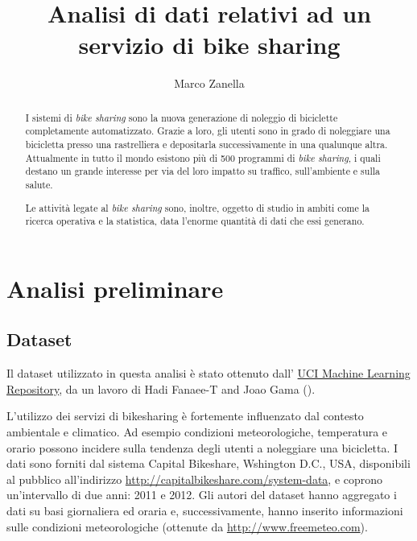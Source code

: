 \documentclass[a4paper, 10pt]{report}
\begin{document}
\title{Analisi di dati relativi ad un\\servizio di bike sharing}
\author{Marco Zanella}
\maketitle




\begin{abstract}
  I sistemi di \emph{bike sharing} sono la nuova generazione di noleggio di
  biciclette completamente automatizzato. Grazie a loro, gli utenti
  sono in grado di noleggiare una bicicletta presso una rastrelliera
  e depositarla successivamente in una qualunque altra. Attualmente in tutto il
  mondo esistono più di 500 programmi di \emph{bike sharing}, i quali
  destano un grande interesse per via del loro impatto su traffico,
  sull'ambiente e sulla salute.
  
  Le attività legate al \emph{bike sharing} sono, inoltre, oggetto di studio
  in ambiti come la ricerca operativa e la statistica, data l'enorme quantità
  di dati che essi generano.
\end{abstract}



\chapter{Analisi preliminare}
\section{Dataset}
Il dataset utilizzato in questa analisi è stato ottenuto dall'
\href{http://archive.ics.uci.edu/ml}{UCI Machine Learning Repository},
da un lavoro di Hadi Fanaee-T and Joao Gama (\cite{fanaee2013}).

L'utilizzo dei servizi di bikesharing è fortemente influenzato dal
contesto ambientale e climatico. Ad esempio condizioni meteorologiche,
temperatura e orario possono incidere sulla tendenza degli utenti a
noleggiare una bicicletta. I dati sono forniti dal sistema Capital
Bikeshare, Wshington D.C., USA, disponibili al pubblico all'indirizzo
\url{http://capitalbikeshare.com/system-data}, e coprono un'intervallo
di due anni: 2011 e 2012. Gli autori del dataset hanno aggregato i dati
su basi giornaliera ed oraria e, successivamente, hanno inserito informazioni
sulle condizioni meteorologiche (ottenute da \url{http://www.freemeteo.com}).
\end{document}
